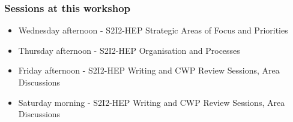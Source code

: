 \begin{frame}
\frametitle{Sessions at this workshop}

\begin{itemize}
\item Wednesday afternoon - S2I2-HEP Strategic Areas of Focus and Priorities
\item Thursday afternoon - S2I2-HEP Organisation and Processes
\item Friday afternoon - S2I2-HEP Writing and CWP Review Sessions, Area Discussions
\item Saturday morning - S2I2-HEP Writing and CWP Review Sessions, Area Discussions
\end{itemize}

\end{frame}



